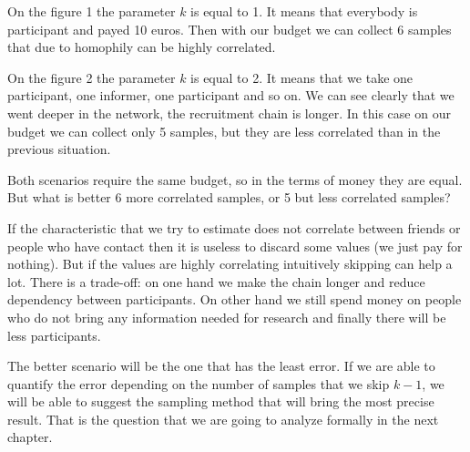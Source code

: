 \documentclass[12pt]{report}
\begin{document}
On the figure 1 the parameter $k$ is equal to 1. It means that everybody is participant and payed 10 euros. Then with our budget we can collect 6 samples that due to homophily can be highly correlated.

On the figure 2 the parameter $k$ is equal to 2. It means that we take one participant, one informer, one participant and so on. We can see clearly that we went deeper in the network, the recruitment chain is longer. In this case on our budget we can collect only 5 samples, but they are less correlated than in the previous situation. 

Both scenarios require the same budget, so in the terms of money they are equal. But what is better 6 more correlated samples, or 5 but less correlated samples? 

If the characteristic that we try to estimate does not correlate between friends or people who have contact then it is useless to discard some values (we just pay for nothing). But if the values are highly correlating intuitively skipping can help a lot. There is a trade-off: on one hand we make the chain longer and reduce dependency between participants. On other hand we still spend money on people who do not bring any information needed for research and finally there will be less participants. 


The better scenario will be the one that has the least error. If we are able to quantify the error depending on the number of samples that we skip $k-1$, we will be able to suggest the sampling method that will bring the most precise result. That is the question that we are going to analyze formally in the next chapter. 
 



\newpage
\end{document}
